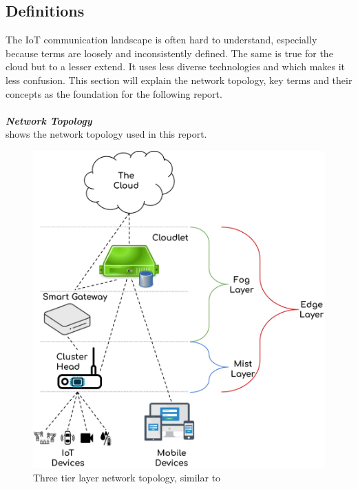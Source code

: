 
\subsection{Definitions} \label{sec:definitions}
The IoT communication landscape is often hard to understand, especially because terms are loosely and inconsistently defined. The same is true for the cloud but to a lesser extend. It uses less diverse technologies and which makes it less confusion. This section will explain the network topology, key terms and their concepts as the foundation for the following report.\\
\vspace{0.5mm} \ \\
\textbf{\textit{Network Topology}}\\
 shows the network topology used in this report. 
\begin{figure}[h!]
    \centering
    \includegraphics[scale=0.15]{figures/network-topology-3-layer.png}
    \caption{Three tier layer network topology, similar to \cite{nsa2017NextWaveIoTDef}}
    \label{fig:networkTopology3Layer}
\end{figure}


